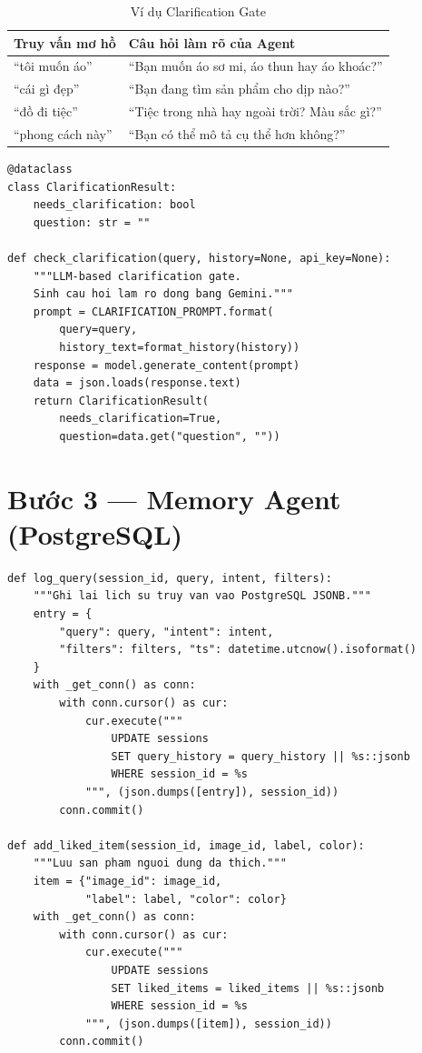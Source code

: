 \documentclass[12pt,a4paper]{report}
\begin{document}
\begin{table}[H]
\centering
\begin{tabular}{ll}
\toprule
\textbf{Truy vấn mơ hồ} & \textbf{Câu hỏi làm rõ của Agent}\\
\midrule
``tôi muốn áo'' & ``Bạn muốn áo sơ mi, áo thun hay áo khoác?''\\
``cái gì đẹp'' & ``Bạn đang tìm sản phẩm cho dịp nào?''\\
``đồ đi tiệc'' & ``Tiệc trong nhà hay ngoài trời? Màu sắc gì?''\\
``phong cách này'' & ``Bạn có thể mô tả cụ thể hơn không?''\\
\bottomrule
\end{tabular}
\caption{Ví dụ Clarification Gate}
\end{table}

\begin{lstlisting}[caption={Clarification Gate --- agent/clarification\_gate.py}]
@dataclass
class ClarificationResult:
    needs_clarification: bool
    question: str = ""

def check_clarification(query, history=None, api_key=None):
    """LLM-based clarification gate.
    Sinh cau hoi lam ro dong bang Gemini."""
    prompt = CLARIFICATION_PROMPT.format(
        query=query,
        history_text=format_history(history))
    response = model.generate_content(prompt)
    data = json.loads(response.text)
    return ClarificationResult(
        needs_clarification=True,
        question=data.get("question", ""))
\end{lstlisting}

\section{Bước 3 --- Memory Agent (PostgreSQL)}

\begin{lstlisting}[caption={Memory Agent --- agent/memory.py}]
def log_query(session_id, query, intent, filters):
    """Ghi lai lich su truy van vao PostgreSQL JSONB."""
    entry = {
        "query": query, "intent": intent,
        "filters": filters, "ts": datetime.utcnow().isoformat()
    }
    with _get_conn() as conn:
        with conn.cursor() as cur:
            cur.execute("""
                UPDATE sessions
                SET query_history = query_history || %s::jsonb
                WHERE session_id = %s
            """, (json.dumps([entry]), session_id))
        conn.commit()

def add_liked_item(session_id, image_id, label, color):
    """Luu san pham nguoi dung da thich."""
    item = {"image_id": image_id,
            "label": label, "color": color}
    with _get_conn() as conn:
        with conn.cursor() as cur:
            cur.execute("""
                UPDATE sessions
                SET liked_items = liked_items || %s::jsonb
                WHERE session_id = %s
            """, (json.dumps([item]), session_id))
        conn.commit()
\end{lstlisting}
\end{document}
